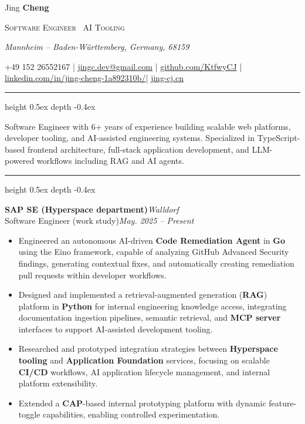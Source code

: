 \documentclass[10pt,a4paper]{article}
\newcommand{\cvsection}[1]{%
  \vspace{8pt}%
  \noindent{\large\bfseries\color{accent}#1\hspace{6pt}}%
  {\color{black!25}\leavevmode\leaders\hrule height 0.5ex depth -0.4ex\hfill\kern0pt}%
  \par\vspace{3pt}%
}
\begin{document}
{\centering
  {\fontsize{38}{46}\selectfont Jing }%
  {\fontsize{38}{46}\bfseries Cheng}\par
  \vspace{4pt}
  {\small\color{accent}\scshape Software Engineer \textperiodcentered\ AI Tooling}\par
  \vspace{2pt}
  {\small\itshape Mannheim – Baden-Württemberg, Germany, 68159}\par
  \vspace{4pt}
  {\small
    +49 152 26552167   \enspace|\enspace
    \href{mailto:jingc.dev@gmail.com}{jingc.dev@gmail.com} \enspace|\enspace
    \href{https://github.com/KtfwyCJ}{github.com/KtfwyCJ} \enspace|\enspace
    \href{https://www.linkedin.com/in/jing-cheng-1a892310b/}{linkedin.com/in/jing-cheng-1a892310b/}\enspace|\enspace
    \href{https://jing-cj.cn/}{jing-cj.cn} 
  }\par
  \vspace{8pt}
}

\vspace{8pt}

\cvsection{Summary}

Software Engineer with 6+ years of experience building scalable web platforms, developer tooling, and AI-assisted engineering systems. Specialized in TypeScript-based frontend architecture, full-stack application development, and LLM-powered workflows including RAG and AI agents.

\vspace{6pt}

\cvsection{Work Experience}

\noindent\textbf{SAP SE (Hyperspace department)}\hfill\textit{Walldorf}\\
{ Software Engineer (work study)}\hfill{\small\itshape May. 2025 -- Present}
\begin{itemize}[leftmargin=*,topsep=2pt,itemsep=1pt,parsep=0pt]
  \item Engineered an autonomous AI-driven \textbf{Code Remediation Agent} in \textbf{Go} using the Eino framework, capable of analyzing GitHub Advanced Security findings, generating contextual fixes, and automatically creating remediation pull requests within developer workflows.

  \item Designed and implemented a retrieval-augmented generation (\textbf{RAG}) platform in \textbf{Python} for internal engineering knowledge access, integrating documentation ingestion pipelines, semantic retrieval, and \textbf{MCP server} interfaces to support AI-assisted development tooling.

  \item Researched and prototyped integration strategies between \textbf{Hyperspace tooling} and \textbf{Application Foundation} services, focusing on scalable \textbf{CI/CD} workflows, AI application lifecycle management, and internal platform extensibility.

  \item Extended a \textbf{CAP}-based internal prototyping platform with dynamic feature-toggle capabilities, enabling controlled experimentation.
\end{itemize}
\end{document}
